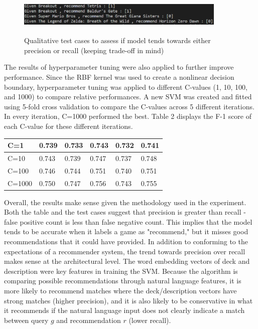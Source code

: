 \documentclass[10pt,twocolumn]{article}
\begin{document}
\begin{figure}[h!]
\includegraphics[width=10cm, height=2cm]{testcases_hyperparams_img.PNG}
\centering
\caption{Qualitative test cases to assess if model tends towards either precision or recall (keeping trade-off in mind)}
\end{figure}

The results of hyperparameter tuning were also applied to further improve performance. Since the RBF kernel was used to create a nonlinear decision boundary, hyperparameter tuning was applied to different C-values (1, 10, 100, and 1000) to compare relative performances. A new SVM was created and fitted using 5-fold cross validation to compare the C-values across 5 different iterations. In every iteration, C=1000 performed the best. Table 2 displays the F-1 score of each C-value for these different iterations.

\begin{center}
\begin{tabular}{ | m{5em} | m{1cm} | m{1cm}| m{1cm} | } 
  \hline
  C=1 & 0.739 & 0.733  & 0.743 & 0.732 & 0.741 \\ 
  \hline
  C=10 & 0.743 & 0.739 & 0.747 & 0.737 & 0.748 \\ 
  \hline
  C=100 & 0.746 & 0.744 & 0.751 & 0.740 & 0.751 \\ 
  \hline
  C=1000 & 0.750 & 0.747 & 0.756 & 0.743 & 0.755 \\
  \hline
\end{tabular}
\end{center}

Overall, the results make sense given the methodology used in the experiment. Both the table and the test cases suggest that precision is greater than recall - false positive count is less than false negative count. This implies that the model tends to be accurate when it labels a game as "recommend," but it misses good recommendations that it could have provided. In addition to conforming to the expectations of a recommender system, the trend towards precision over recall makes sense at the architectural level. The word embedding vectors of deck and description were key features in training the SVM. Because the algorithm is comparing possible recommendations through natural language features, it is more likely to recommend matches where the deck/description vectors have strong matches (higher precision), and it is also likely to be conservative in what it recommends if the natural language input does not clearly indicate a match between query $g$ and recommendation $r$ (lower recall).
\end{document}
